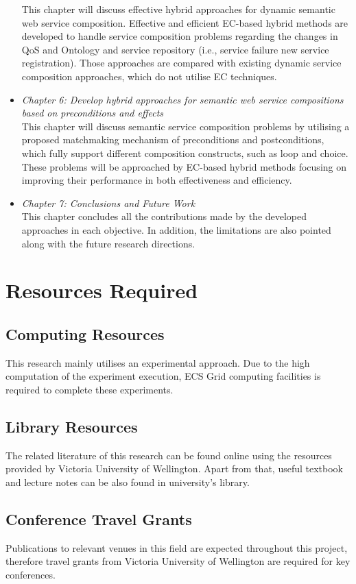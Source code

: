 \begin{itemize}
This chapter will discuss effective hybrid approaches for dynamic semantic web service composition. Effective and efficient EC-based hybrid methods are developed to handle service composition problems regarding the changes in QoS and Ontology and service repository (i.e., service failure new service registration). Those approaches are compared with existing dynamic service composition approaches, which do not utilise EC techniques.
 \item \textit{Chapter 6: Develop hybrid approaches for semantic web service compositions based on preconditions and effects}\\
This chapter will discuss semantic service composition problems by utilising a proposed matchmaking mechanism of preconditions and postconditions, which fully support different composition constructs, such as loop and choice. These problems will be approached by EC-based hybrid methods focusing on improving their performance in both effectiveness and efficiency.
 \item \textit{Chapter 7: Conclusions and Future Work}\\
This chapter concludes all the contributions made by the developed approaches in each objective. In addition, the limitations are also pointed along with the future research directions.
\end{itemize}


\section{Resources Required}

\subsection{Computing Resources}
This research mainly utilises an experimental approach. Due to the high computation of the experiment execution, ECS Grid computing facilities is required to complete these experiments.

\subsection{Library Resources}
The related literature of this research can be found online using the resources provided by Victoria University of Wellington. Apart from that, useful textbook and lecture notes can be also found in university's library.

\subsection{Conference Travel Grants}
Publications to relevant venues in this field are expected throughout this project, therefore travel grants from Victoria University of Wellington are required for key conferences.